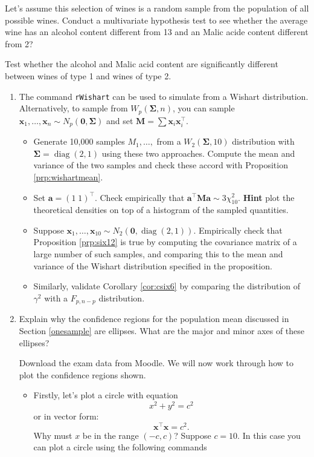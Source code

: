 \documentclass[]{book}
\providecommand{\tightlist}{%
  \setlength{\itemsep}{0pt}\setlength{\parskip}{0pt}}
\theoremstyle{definition}
\theoremstyle{definition}
\theoremstyle{definition}
\theoremstyle{remark}
\begin{document}
Let's assume this selection of wines is a random sample from the population of all possible wines. Conduct a multivariate hypothesis test to see whether the average wine has an alcohol content different from 13 and an Malic acide content different from 2?

Test whether the alcohol and Malic acid content are significantly different between wines of type 1 and wines of type 2.

\begin{enumerate}
\def\labelenumi{\arabic{enumi}.}
\setcounter{enumi}{1}
\item
  The command \texttt{rWishart} can be used to simulate from a Wishart distribution. Alternatively, to sample from \(W_p(\boldsymbol{\Sigma},n)\), you can sample \(\mathbf x_1, \ldots, \mathbf x_n \sim N_p(\boldsymbol 0, \boldsymbol{\Sigma})\) and set \(\mathbf M= \sum \mathbf x_i \mathbf x_i^\top\).

  \begin{itemize}
  \item
    Generate 10,000 samples \(M_1, \ldots,\) from a \(W_2(\boldsymbol{\Sigma}, 10)\) distribution with \(\boldsymbol{\Sigma}= \operatorname{diag}(2,1)\) using these two approaches. Compute the mean and variance of the two samples and check these accord with Proposition \ref{prp:wishartmean}.
  \item
    Set \(\mathbf a= (1\; 1)^\top\). Check empirically that \(\mathbf a^\top \mathbf M\mathbf a\sim 3 \chi^2_10\). \textbf{Hint} plot the theoretical densities on top of a histogram of the sampled quantities.
  \item
    Suppose \(\mathbf x_1, \ldots, \mathbf x_{10} \sim N_2(\boldsymbol 0, \operatorname{diag}(2,1))\). Empirically check that Proposition \ref{prp:six12} is true by computing the covariance matrix of a large number of such samples, and comparing this to the mean and variance of the Wishart distribution specified in the proposition.
  \item
    Similarly, validate Corollary \ref{cor:csix6} by comparing the distribution of \(\gamma^2\) with a \(F_{p, n-p}\) distribution.
  \end{itemize}
\item
  Explain why the confidence regions for the population mean discussed in Section \ref{onesample} are ellipses. What are the major and minor axes of these ellipses?

  Download the exam data from Moodle. We will now work through how to plot the confidence regions shown.

  \begin{itemize}
  \tightlist
  \item
    Firstly, let's plot a circle with equation
    \[x^2+y^2=c^2\]
    or in vector form:
    \[\mathbf x^\top\mathbf x=c^2.\]
    Why must \(x\) be in the range \((-c,c)\)? Suppose \(c=10\). In this case you can plot a circle using the following commands
  \end{itemize}
\end{enumerate}
\end{document}
